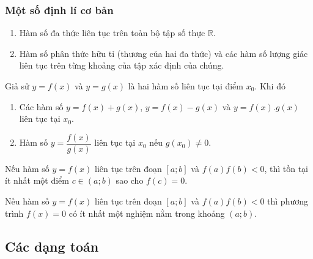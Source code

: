 \subsubsection{Một số định lí cơ bản}
\begin{dl}
\hfill
\begin{enumerate}
\item  Hàm số đa thức liên tục trên toàn bộ tập số thực $\mathbb{R}$.
\item Hàm số phân thức hữu tỉ (thương của hai đa thức) và các hàm số lượng giác liên tục trên từng khoảng của tập xác định của chúng.
\end{enumerate}
\end{dl}

\begin{dl}
Giả sử $y=f(x)$ và $y=g(x)$ là hai hàm số liên tục tại điểm $x_0$. Khi đó
\begin{enumerate}
\item Các hàm số $y=f(x)+g(x)$, $y=f(x)-g(x)$ và $y=f(x).g(x)$ liên tục tại $x_0$.
\item Hàm số $y=\dfrac{f(x)}{g(x)}$ liên tục tại $x_0$ nếu $g(x_0)\neq 0$.
\end{enumerate}
\end{dl}

\begin{dl}
Nếu hàm số $y=f(x)$ liên tục trên đoạn $[a;b]$ và $f(a)f(b)<0$, thì tồn tại ít nhất một điểm $c\in (a;b)$ sao cho $f(c)=0$.
\end{dl}

\begin{note}
Nếu hàm số $y=f(x)$ liên tục trên đoạn $[a;b]$ và $f(a)f(b)<0$ thì phương trình $f(x)=0$ có ít nhất một nghiệm nằm trong khoảng $(a;b)$.
\end{note}


\subsection{Các dạng toán}

